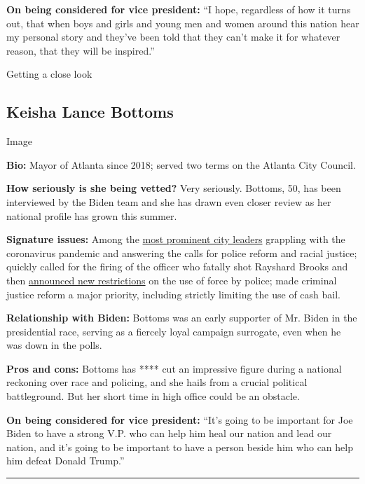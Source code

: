 \textbf{On being considered for vice president:} ``I hope, regardless of
how it turns out, that when boys and girls and young men and women
around this nation hear my personal story and they've been told that
they can't make it for whatever reason, that they will be inspired.''

Getting a close look

\hypertarget{keisha-lance-bottoms}{%
\subsection{Keisha Lance Bottoms}\label{keisha-lance-bottoms}}

Image

\textbf{Bio:} Mayor of Atlanta since 2018; served two terms on the
Atlanta City Council.

\textbf{How seriously is she being vetted?} Very seriously. Bottoms, 50,
has been interviewed by the Biden team and she has drawn even closer
review as her national profile has grown this summer.

\textbf{Signature issues:} Among the
\href{https://www.nytimes.com/2020/06/03/opinion/police-protests-atlanta-keisha-bottoms.html}{most
prominent city leaders} grappling with the coronavirus pandemic and
answering the calls for police reform and racial justice; quickly called
for the firing of the officer who fatally shot Rayshard Brooks and then
\href{https://www.nytimes.com/2020/06/15/us/rayshard-brooks-keisha-bottoms-atlanta.html}{announced
new restrictions} on the use of force by police; made criminal justice
reform a major priority, including strictly limiting the use of cash
bail.

\textbf{Relationship with Biden:} Bottoms was an early supporter of Mr.
Biden in the presidential race, serving as a fiercely loyal campaign
surrogate, even when he was down in the polls.

\textbf{Pros and cons:} Bottoms has **** cut an impressive figure during
a national reckoning over race and policing, and she hails from a
crucial political battleground. But her short time in high office could
be an obstacle.

\textbf{On being considered for vice president:} ``It's going to be
important for Joe Biden to have a strong V.P. who can help him heal our
nation and lead our nation, and it's going to be important to have a
person beside him who can help him defeat Donald Trump.''

\begin{center}\rule{0.5\linewidth}{\linethickness}\end{center}

